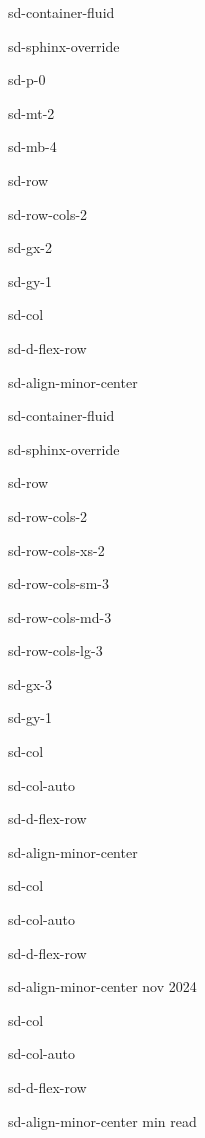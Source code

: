 \documentclass[letterpaper,10pt,italian]{jupyterBook}
\begin{document}
\begin{sphinxuseclass}{sd-container-fluid}
\begin{sphinxuseclass}{sd-sphinx-override}
\begin{sphinxuseclass}{sd-p-0}
\begin{sphinxuseclass}{sd-mt-2}
\begin{sphinxuseclass}{sd-mb-4}
\begin{sphinxuseclass}{sd-row}
\begin{sphinxuseclass}{sd-row-cols-2}
\begin{sphinxuseclass}{sd-gx-2}
\begin{sphinxuseclass}{sd-gy-1}
\begin{sphinxuseclass}{sd-col}
\begin{sphinxuseclass}{sd-d-flex-row}
\begin{sphinxuseclass}{sd-align-minor-center}
\begin{sphinxuseclass}{sd-container-fluid}
\begin{sphinxuseclass}{sd-sphinx-override}
\begin{sphinxuseclass}{sd-row}
\begin{sphinxuseclass}{sd-row-cols-2}
\begin{sphinxuseclass}{sd-row-cols-xs-2}
\begin{sphinxuseclass}{sd-row-cols-sm-3}
\begin{sphinxuseclass}{sd-row-cols-md-3}
\begin{sphinxuseclass}{sd-row-cols-lg-3}
\begin{sphinxuseclass}{sd-gx-3}
\begin{sphinxuseclass}{sd-gy-1}
\begin{sphinxuseclass}{sd-col}
\begin{sphinxuseclass}{sd-col-auto}
\begin{sphinxuseclass}{sd-d-flex-row}
\begin{sphinxuseclass}{sd-align-minor-center}
\end{sphinxuseclass}
\end{sphinxuseclass}
\end{sphinxuseclass}
\end{sphinxuseclass}
\begin{sphinxuseclass}{sd-col}
\begin{sphinxuseclass}{sd-col-auto}
\begin{sphinxuseclass}{sd-d-flex-row}
\begin{sphinxuseclass}{sd-align-minor-center}
 nov 2024

\end{sphinxuseclass}
\end{sphinxuseclass}
\end{sphinxuseclass}
\end{sphinxuseclass}
\begin{sphinxuseclass}{sd-col}
\begin{sphinxuseclass}{sd-col-auto}
\begin{sphinxuseclass}{sd-d-flex-row}
\begin{sphinxuseclass}{sd-align-minor-center}
 min read


\end{sphinxuseclass}
\end{sphinxuseclass}
\end{sphinxuseclass}
\end{sphinxuseclass}
\end{sphinxuseclass}
\end{sphinxuseclass}
\end{sphinxuseclass}
\end{sphinxuseclass}
\end{sphinxuseclass}
\end{sphinxuseclass}
\end{sphinxuseclass}
\end{sphinxuseclass}
\end{sphinxuseclass}
\end{sphinxuseclass}
\end{sphinxuseclass}
\end{sphinxuseclass}
\end{sphinxuseclass}
\end{sphinxuseclass}
\end{sphinxuseclass}
\end{sphinxuseclass}
\end{sphinxuseclass}
\end{sphinxuseclass}
\end{sphinxuseclass}
\end{sphinxuseclass}
\end{sphinxuseclass}
\end{sphinxuseclass}
\end{document}
